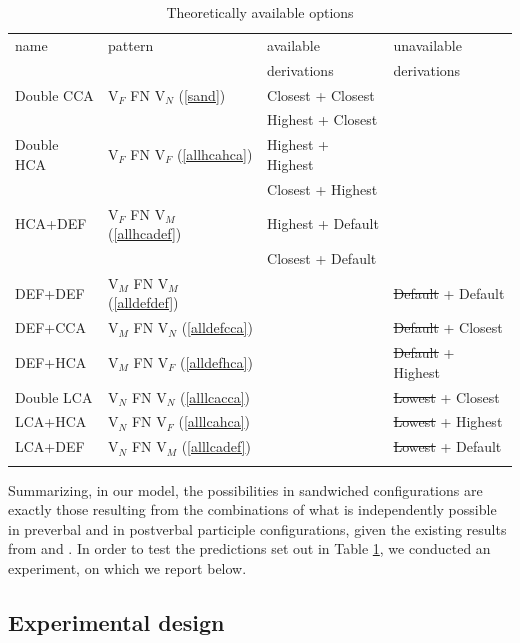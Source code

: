\documentclass[output=paper
,modfonts
,nonflat]{langsci/langscibook}
\begin{document}
\begin{table}
\begin{tabularx}{\textwidth}{Xlll}
\lsptoprule
name & pattern & available & unavailable \\ 
 &   & derivations & derivations \\ 
\midrule
Double CCA & V$_F$ FN V$_N$ (\ref{sand})& Closest + Closest \\
& &  Highest + Closest &  \\ \midrule
Double HCA & V$_F$ FN V$_F$ (\ref{allhcahca})& Highest + Highest \\ 
& &  Closest + Highest & \\\midrule
HCA+DEF & V$_F$ FN V$_M$ (\ref{allhcadef})&Highest + Default  \\
& & Closest + Default & \\ \midrule
DEF+DEF & V$_M$ FN V$_M$  (\ref{alldefdef})& & \sout{Default} + Default \\ \midrule
DEF+CCA & V$_M$ FN V$_N$  (\ref{alldefcca})& & \sout{Default} + Closest \\ 
\midrule
DEF+HCA & V$_M$ FN V$_F$  (\ref{alldefhca})& & \sout{Default} + Highest \\ \midrule
Double LCA & V$_N$ FN V$_N$  (\ref{alllcacca})& &\sout{Lowest} + Closest \\ 
\midrule
LCA+HCA & V$_N$ FN V$_F$  (\ref{alllcahca})& & \sout{Lowest} + Highest \\ \midrule
LCA+DEF & V$_N$ FN V$_M$  (\ref{alllcadef})& & \sout{Lowest} + Default \\ 
\lspbottomrule
\end{tabularx} 
\caption{Theoretically available options}
\label{tab:sandwichoptions}
\end{table}
\newpage\noindent Summarizing, in our model, the possibilities in sandwiched configurations are exactly those resulting from the combinations of what is independently possible in preverbal and in postverbal participle configurations, given the existing results from \citet{marusicnevinsbadecker:15} and \citet{willergold:16}. In order to test the predictions set out in Table \ref{tab:sandwichoptions}, we conducted an experiment, on which we report below.

\subsection{Experimental design} \label{sec:expdesign}
\end{document}
